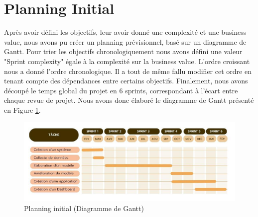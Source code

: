 \section{Planning Initial}
Après avoir défini les objectifs, leur avoir donné une complexité et une business
value, nous avons pu créer un planning prévisionnel, basé sur un diagramme de Gantt. Pour
trier les objectifs chronologiquement nous avons défini une valeur "Sprint complexity"
égale à la complexité sur la business value. L'ordre croissant nous a donné l'ordre
chronologique. Il a tout de même fallu modifier cet ordre en tenant compte des dépendances
entre certains objectifs. Finalement, nous avons découpé le temps global du projet en 6
sprints, correspondant à l'écart entre chaque revue de projet. Nous avons donc élaboré le
diagramme de Gantt présenté en Figure \ref{gantt}.

\begin{figure}
    \center
    \includegraphics[scale=.2]{img/gantt.png}
    \caption{Planning initial (Diagramme de Gantt)}
    \label{gantt}
\end{figure}
